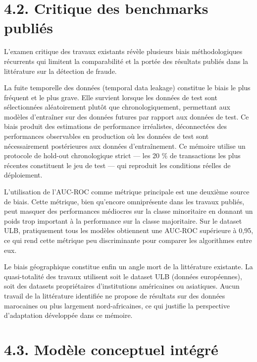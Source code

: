 \section{4.2. Critique des benchmarks publiés}

L'examen critique des travaux existants révèle plusieurs biais méthodologiques récurrents qui limitent la comparabilité et la portée des résultats publiés dans la littérature sur la détection de fraude.

La fuite temporelle des données (temporal data leakage) constitue le biais le plus fréquent et le plus grave. Elle survient lorsque les données de test sont sélectionnées aléatoirement plutôt que chronologiquement, permettant aux modèles d'entraîner sur des données futures par rapport aux données de test. Ce biais produit des estimations de performance irréalistes, déconnectées des performances observables en production où les données de test sont nécessairement postérieures aux données d'entraînement. Ce mémoire utilise un protocole de hold-out chronologique strict — les 20 \% de transactions les plus récentes constituent le jeu de test — qui reproduit les conditions réelles de déploiement.

L'utilisation de l'AUC-ROC comme métrique principale est une deuxième source de biais. Cette métrique, bien qu'encore omniprésente dans les travaux publiés, peut masquer des performances médiocres sur la classe minoritaire en donnant un poids trop important à la performance sur la classe majoritaire. Sur le dataset ULB, pratiquement tous les modèles obtiennent une AUC-ROC supérieure à 0,95, ce qui rend cette métrique peu discriminante pour comparer les algorithmes entre eux.

Le biais géographique constitue enfin un angle mort de la littérature existante. La quasi-totalité des travaux utilisent soit le dataset ULB (données européennes), soit des datasets propriétaires d'institutions américaines ou asiatiques. Aucun travail de la littérature identifiée ne propose de résultats sur des données marocaines ou plus largement nord-africaines, ce qui justifie la perspective d'adaptation développée dans ce mémoire.

\section{4.3. Modèle conceptuel intégré}

